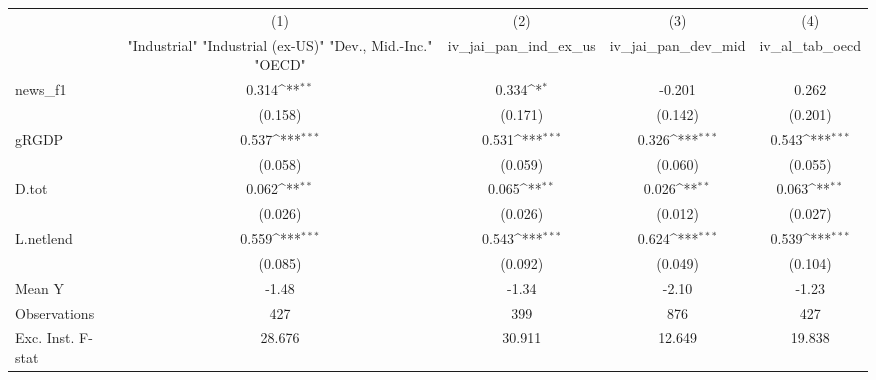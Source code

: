 {
\def\sym#1{\ifmmode^{#1}\else\(^{#1}\)\fi}
\begin{tabular}{l*{4}{c}}
\toprule
            &\multicolumn{1}{c}{(1)}&\multicolumn{1}{c}{(2)}&\multicolumn{1}{c}{(3)}&\multicolumn{1}{c}{(4)}\\
            &\multicolumn{1}{c}{ "Industrial" "Industrial (ex-US)" "Dev., Mid.-Inc." "OECD" }&\multicolumn{1}{c}{iv\_jai\_pan\_ind\_ex\_us}&\multicolumn{1}{c}{iv\_jai\_pan\_dev\_mid}&\multicolumn{1}{c}{iv\_al\_tab\_oecd}\\
\midrule
news\_f1     &       0.314\sym{**} &       0.334\sym{*}  &      -0.201         &       0.262         \\
            &     (0.158)         &     (0.171)         &     (0.142)         &     (0.201)         \\
\addlinespace
gRGDP       &       0.537\sym{***}&       0.531\sym{***}&       0.326\sym{***}&       0.543\sym{***}\\
            &     (0.058)         &     (0.059)         &     (0.060)         &     (0.055)         \\
\addlinespace
D.tot       &       0.062\sym{**} &       0.065\sym{**} &       0.026\sym{**} &       0.063\sym{**} \\
            &     (0.026)         &     (0.026)         &     (0.012)         &     (0.027)         \\
\addlinespace
L.netlend   &       0.559\sym{***}&       0.543\sym{***}&       0.624\sym{***}&       0.539\sym{***}\\
            &     (0.085)         &     (0.092)         &     (0.049)         &     (0.104)         \\
\midrule
Mean Y      &       -1.48         &       -1.34         &       -2.10         &       -1.23         \\
Observations&         427         &         399         &         876         &         427         \\
Exc. Inst. F-stat&      28.676         &      30.911         &      12.649         &      19.838         \\
\bottomrule
\end{tabular}
}
